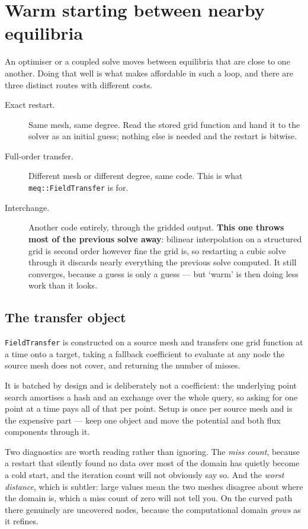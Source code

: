 \section{Warm starting between nearby equilibria}

An optimiser or a coupled solve moves between equilibria that are close to one
another. Doing that well is what makes {\meq} affordable in such a loop, and
there are three distinct routes with different costs.

\begin{description}

\item[Exact restart.] Same mesh, same degree. Read the stored grid function and
	hand it to the solver as an initial guess; nothing else is needed and the
	restart is bitwise.

\item[Full-order transfer.] Different mesh or different degree, same code. This
	is what \texttt{meq::FieldTransfer} is for.

\item[Interchange.] Another code entirely, through the gridded output.
	\textbf{This one throws most of the previous solve away}: bilinear
	interpolation on a structured grid is second order however fine the grid is,
	so restarting a cubic solve through it discards nearly everything the
	previous solve computed. It still converges, because a guess is only a guess
	--- but `warm' is then doing less work than it looks.

\end{description}

\subsection{The transfer object}

\texttt{FieldTransfer} is constructed on a source mesh and transfers one grid
function at a time onto a target, taking a fallback coefficient to evaluate at
any node the source mesh does not cover, and returning the number of misses.

It is batched by design and is deliberately not a coefficient: the underlying
point search amortises a hash and an exchange over the whole query, so asking for
one point at a time pays all of that per point. Setup is once per source mesh and
is the expensive part --- keep one object and move the potential and both flux
components through it.

Two diagnostics are worth reading rather than ignoring. The \emph{miss count},
because a restart that silently found no data over most of the domain has quietly
become a cold start, and the iteration count will not obviously say so. And the
\emph{worst distance}, which is subtler: large values mean the two meshes
disagree about where the domain is, which a miss count of zero will not tell you.
On the curved path there genuinely are uncovered nodes, because the computational
domain \emph{grows} as it refines.

